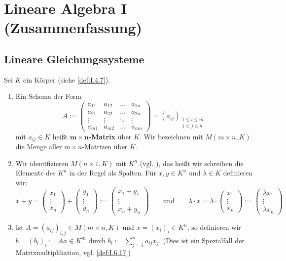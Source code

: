\chapter{Lineare Algebra I (Zusammenfassung)} %
\label{cha:1}
\setcounter{section}{2}
\section{Lineare Gleichungssysteme}
\setcounter{definition}{4}
\begin{definition}[Matrix]
	\label{def:I.3.5}
	Sei $K$ ein Körper (siehe \autoref{def:I.4.7}).
	\begin{enumerate}[(1)]
		\item Ein Schema der Form
		\[
			A := \begin{pmatrix}
				a_{11} & a_{12} & \dots & a_{1n} \\
				a_{21} & a_{22} & \dots & a_{2n} \\
				\vdots & \vdots & \ddots & \vdots \\
				a_{m1} & a_{m2} & \dots & a_{mn}
			\end{pmatrix} = (a_{ij})_{\substack{1 \leq i \leq m \\ 1 \leq j \leq n}}
		\]
		mit $a_{ij} \in K$ heißt $\bm{m \times n}$\textbf{-Matrix} über $K$. 
		Wir bezeichnen mit $M(m \times n,K)$ die Menge aller $m \times n$-Matrizen über $K$.
		\item Wir identifizieren $M(n \times 1,K)$ mit $K^n$ (vgl. ), das heißt wir schreiben die Elemente des $K^n$ in der Regel als Spalten.
		Für $x,y \in K^n$ und $\lambda \in K$ definieren wir:
		\[
			x+y = \begin{pmatrix} x_1 \\ \vdots \\ x_n \end{pmatrix} + \begin{pmatrix} y_1 \\ \vdots \\ y_n \end{pmatrix} := \begin{pmatrix} x_1 + y_1 \\ \vdots \\ x_n + y_n \end{pmatrix} \qquad \text{und} \qquad \lambda \cdot x = \lambda \cdot \begin{pmatrix} x_1 \\ \vdots \\ x_n \end{pmatrix} := \begin{pmatrix} \lambda x_1 \\ \vdots \\ \lambda x_n \end{pmatrix}
		\]
		\item Ist $A = (a_{ij})_{i,j} \in M(m \times n,K)$ und $x = (x_i)_i \in K^n$, so definieren wir $b = (b_i)_i := Ax \in K^m$ durch $b_i := \sum\limits_{j=1}^n a_{ij}x_j$.
		(Dies ist ein Spezialfall der Matrixmultiplikation, vgl. \autoref{def:I.6.17})
	\end{enumerate}
\end{definition}

